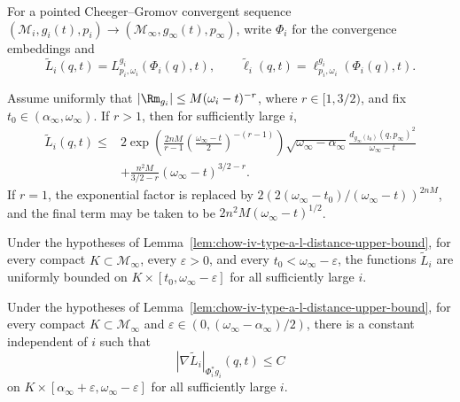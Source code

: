 For a pointed Cheeger--Gromov convergent sequence
\((\mathcal M_i,g_i(t),p_i)\to(\mathcal M_\infty,g_\infty(t),p_\infty)\),
write \(\Phi_i\) for the convergence embeddings and
\[
 \widetilde L_i(q,t)=L^{g_i}_{p_i,\omega_i}(\Phi_i(q),t),
 \qquad
 \widetilde\ell_i(q,t)=\ell^{g_i}_{p_i,\omega_i}(\Phi_i(q),t).
\]

\begin{lemma}
\label{lem:chow-iv-type-a-l-distance-upper-bound}
Assume uniformly that
\(|\Rm_{g_i}|\leq M(\omega_i-t)^{-r}\), where \(r\in[1,3/2)\), and fix
\(t_0\in(\alpha_\infty,\omega_\infty)\).  If \(r>1\), then for sufficiently
large \(i\),
\[
\begin{split}
 \widetilde L_i(q,t)\leq{}&
 2\exp\!\left(\frac{2nM}{r-1}
 \left(\frac{\omega_\infty-t}{2}\right)^{-(r-1)}\right)
 \sqrt{\omega_\infty-\alpha_\infty}
 \frac{d_{g_\infty(t_0)}(q,p_\infty)^2}{\omega_\infty-t}\\
 &+\frac{n^2M}{3/2-r}(\omega_\infty-t)^{3/2-r}.
\end{split}
\]
If \(r=1\), the exponential factor is replaced by
\(2(2(\omega_\infty-t_0)/(\omega_\infty-t))^{2nM}\), and the final term
may be taken to be \(2n^2M(\omega_\infty-t)^{1/2}\).
\end{lemma}

\begin{corollary}
\label{cor:chow-iv-type-a-l-distance-compact-bound}
Under the hypotheses of Lemma~\ref{lem:chow-iv-type-a-l-distance-upper-bound},
for every compact \(K\subset\mathcal M_\infty\), every
\(\varepsilon>0\), and every
\(t_0<\omega_\infty-\varepsilon\), the functions \(\widetilde L_i\) are
uniformly bounded on \(K\times[t_0,\omega_\infty-\varepsilon]\) for all
sufficiently large \(i\).
\end{corollary}

\begin{lemma}
\label{lem:chow-iv-type-a-l-distance-gradient-bound}
Under the hypotheses of Lemma~\ref{lem:chow-iv-type-a-l-distance-upper-bound},
for every compact \(K\subset\mathcal M_\infty\) and
\(\varepsilon\in(0,(\omega_\infty-\alpha_\infty)/2)\), there is a constant
independent of \(i\) such that
\[
 |\nabla\widetilde L_i|_{\Phi_i^*g_i}(q,t)\leq C
\]
on \(K\times[\alpha_\infty+\varepsilon,
\omega_\infty-\varepsilon]\) for all sufficiently large \(i\).
\end{lemma}


